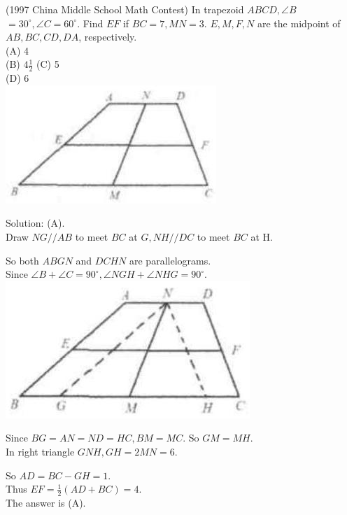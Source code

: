 \documentclass{article}
\begin{document}
(1997 China Middle School Math Contest) In trapezoid \(A B C D, \angle B\) \(=30^{\circ}, \angle C=60^{\circ}\). Find \(E F\) if \(B C=7, M N=3\). \(E, M, F, N\) are the midpoint of \(A B, B C, C D, D A\), respectively.\\
(A) 4\\
(B) \(4 \frac{1}{2}\) (C) 5\\
(D) 6\\
\centering
\includegraphics[width=\textwidth]{images/116(2).jpg}

Solution: (A).\\
Draw \(N G / / A B\) to meet \(B C\) at \(G, N H / / D C\) to meet \(B C\) at H.

So both \(A B G N\) and \(D C H N\) are parallelograms.\\
Since \(\angle B+\angle C=90^{\circ}, \angle N G H+\angle N H G=90^{\circ}\).\\
\centering
\includegraphics[width=\textwidth]{images/116(1).jpg}

Since \(B G=A N=N D=H C, B M=M C\). So \(G M=M H\).\\
In right triangle \(G N H, G H=2 M N=6\).


So \(A D=B C-G H=1\).\\
Thus \(E F=\frac{1}{2}(A D+B C)=4\).\\
The answer is (A).
\end{document}
